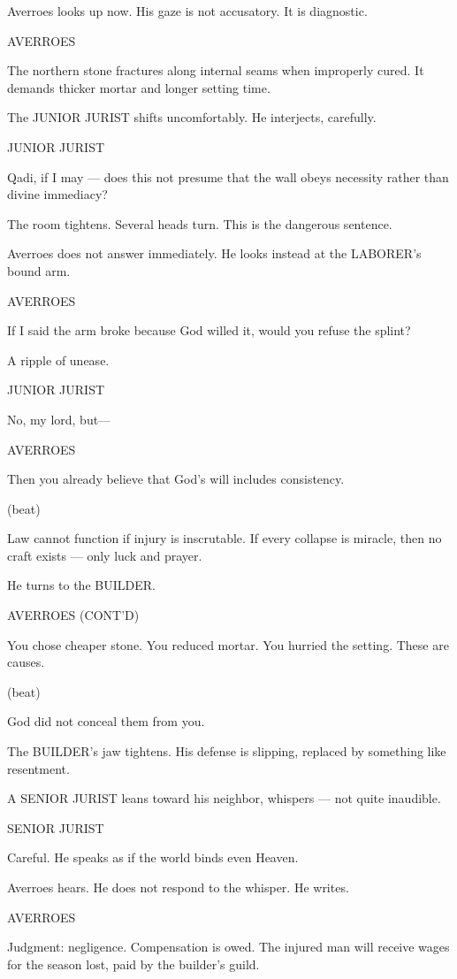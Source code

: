 \documentclass[12pt]{article}
\newlength{\charindent}
\newlength{\dialogueindent}
\newlength{\dialoguewidth}
\newlength{\parentheticalindent}
\newcommand{\action}[1]{%
  \noindent#1\par\vspace{0.75em}%
}
\newcommand{\character}[1]{%
  \needspace{3\baselineskip}%
  \par\vspace{0.5em}%
  \noindent\hspace*{\charindent}\MakeUppercase{#1}\nopagebreak[4]%
}
\newcommand{\parenthetical}[1]{%
  \par\nobreak\nopagebreak[4]%
  \noindent\hspace*{\parentheticalindent}(#1)%
}
\newcommand{\dialogue}[1]{%
  \par\nobreak\nopagebreak[4]%
  \noindent\hspace*{\dialogueindent}%
  \begin{minipage}[t]{\dialoguewidth}
  #1
  \end{minipage}%
  \par\vspace{0.5em}%
}
\newcommand{\contd}{\textsc{(cont'd)}}
\newcommand{\beat}{\parenthetical{beat}}
\begin{document}
\action{Averroes looks up now. His gaze is not accusatory. It is diagnostic.}

\character{AVERROES}
\dialogue{The northern stone fractures along internal seams when improperly cured. It demands thicker mortar and longer setting time.}

\action{The JUNIOR JURIST shifts uncomfortably. He interjects, carefully.}

\character{JUNIOR JURIST}
\dialogue{Qadi, if I may — does this not presume that the wall obeys necessity rather than divine immediacy?}

\action{The room tightens. Several heads turn. This is the dangerous sentence.}

\action{Averroes does not answer immediately. He looks instead at the LABORER’s bound arm.}

\character{AVERROES}
\dialogue{If I said the arm broke because God willed it, would you refuse the splint?}

\action{A ripple of unease.}

\character{JUNIOR JURIST}
\dialogue{No, my lord, but—}

\character{AVERROES}
\dialogue{Then you already believe that God’s will includes consistency.}

\beat

\dialogue{Law cannot function if injury is inscrutable. If every collapse is miracle, then no craft exists — only luck and prayer.}

\action{He turns to the BUILDER.}

\character{AVERROES \contd}
\dialogue{You chose cheaper stone. You reduced mortar. You hurried the setting. These are causes.}

\beat

\dialogue{God did not conceal them from you.}

\action{The BUILDER’s jaw tightens. His defense is slipping, replaced by something like resentment.}

\action{A SENIOR JURIST leans toward his neighbor, whispers — not quite inaudible.}

\character{SENIOR JURIST}
\dialogue{Careful. He speaks as if the world binds even Heaven.}

\action{Averroes hears. He does not respond to the whisper. He writes.}

\character{AVERROES}
\dialogue{Judgment: negligence. Compensation is owed. The injured man will receive wages for the season lost, paid by the builder’s guild.}
\end{document}
